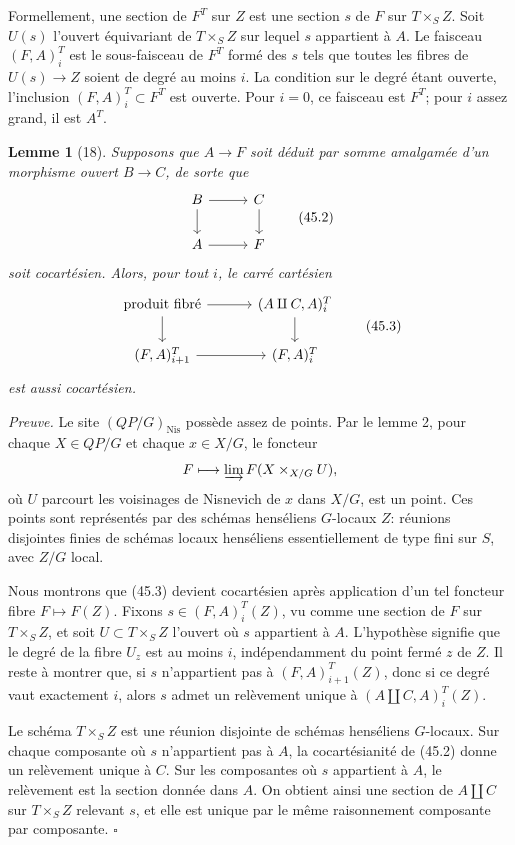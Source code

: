 \documentclass[11pt]{article}
\newcommand{\Nis}{\mathrm{Nis}}
\theoremstyle{deligne}
\newtheorem*{lemma*}{Lemme}
\newenvironment{proofdel}{\noindent\textit{Preuve.}}{\hfill$\square$}
\begin{document}
Formellement, une section de \(F^T\) sur \(Z\) est une section \(s\) de \(F\) sur \(T\times_S Z\). Soit \(U(s)\) l'ouvert équivariant de \(T\times_S Z\) sur lequel \(s\) appartient à \(A\). Le faisceau \((F,A)^T_i\) est le sous-faisceau de \(F^T\) formé des \(s\) tels que toutes les fibres de \(U(s)\to Z\) soient de degré au moins \(i\). La condition sur le degré étant ouverte, l'inclusion \((F,A)^T_i\subset F^T\) est ouverte. Pour \(i=0\), ce faisceau est \(F^T\); pour \(i\) assez grand, il est \(A^T\).

\begin{lemma*}[18]
Supposons que \(A\to F\) soit déduit par somme amalgamée d'un morphisme ouvert \(B\to C\), de sorte que
\[
\begin{tikzcd}[column sep=2.8em,row sep=1.8em]
B \arrow[r] \arrow[d] & C \arrow[d]\\
A \arrow[r] & F
\end{tikzcd}
\tag{45.2}
\]
soit cocartésien. Alors, pour tout \(i\), le carré cartésien
\[
\begin{tikzcd}[column sep=3.2em,row sep=1.8em]
\text{produit fibré} \arrow[r] \arrow[d] &
(A\amalg C,A)^T_i \arrow[d]\\
(F,A)^T_{i+1} \arrow[r] &
(F,A)^T_i
\end{tikzcd}
\tag{45.3}
\]
est aussi cocartésien.
\end{lemma*}

\begin{proofdel}
Le site \((QP/G)_{\Nis}\) possède assez de points. Par le lemme 2, pour chaque \(X\in QP/G\) et chaque \(x\in X/G\), le foncteur
\[
F\longmapsto \varinjlim F(X\times_{X/G}U),
\]
où \(U\) parcourt les voisinages de Nisnevich de \(x\) dans \(X/G\), est un point. Ces points sont représentés par des schémas henséliens \(G\)-locaux \(Z\): réunions disjointes finies de schémas locaux henséliens essentiellement de type fini sur \(S\), avec \(Z/G\) local.

Nous montrons que (45.3) devient cocartésien après application d'un tel foncteur fibre \(F\mapsto F(Z)\). Fixons \(s\in(F,A)^T_i(Z)\), vu comme une section de \(F\) sur \(T\times_S Z\), et soit \(U\subset T\times_S Z\) l'ouvert où \(s\) appartient à \(A\). L'hypothèse signifie que le degré de la fibre \(U_z\) est au moins \(i\), indépendamment du point fermé \(z\) de \(Z\). Il reste à montrer que, si \(s\) n'appartient pas à \((F,A)^T_{i+1}(Z)\), donc si ce degré vaut exactement \(i\), alors \(s\) admet un relèvement unique à \((A\amalg C,A)^T_i(Z)\).

Le schéma \(T\times_S Z\) est une réunion disjointe de schémas henséliens \(G\)-locaux. Sur chaque composante où \(s\) n'appartient pas à \(A\), la cocartésianité de (45.2) donne un relèvement unique à \(C\). Sur les composantes où \(s\) appartient à \(A\), le relèvement est la section donnée dans \(A\). On obtient ainsi une section de \(A\amalg C\) sur \(T\times_S Z\) relevant \(s\), et elle est unique par le même raisonnement composante par composante.
\end{proofdel}
\end{document}
